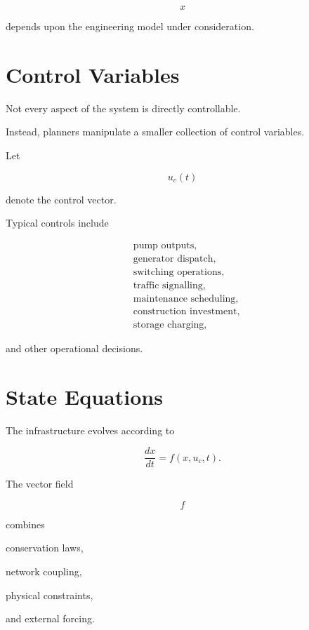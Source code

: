 \documentclass[11pt,fleqn]{book}
\numberwithin{equation}{chapter}
\theoremstyle{plain}
\theoremstyle{definition}
\theoremstyle{remark}
\begin{document}
\[
x
\]

depends upon the engineering model under consideration.


\section{Control Variables}

Not every aspect of the system is directly controllable.

Instead, planners manipulate a smaller collection of control variables.

Let

\[
u_c(t)
\]

denote the control vector.

Typical controls include

\[
\begin{aligned}
&
\text{pump outputs},\\
&
\text{generator dispatch},\\
&
\text{switching operations},\\
&
\text{traffic signalling},\\
&
\text{maintenance scheduling},\\
&
\text{construction investment},\\
&
\text{storage charging},
\end{aligned}
\]

and other operational decisions.


\section{State Equations}

The infrastructure evolves according to

\[
\boxed{
\frac{dx}{dt}
=
f(x,u_c,t).
}
\]

The vector field

\[
f
\]

combines

conservation laws,

network coupling,

physical constraints,

and external forcing.

\end{document}
